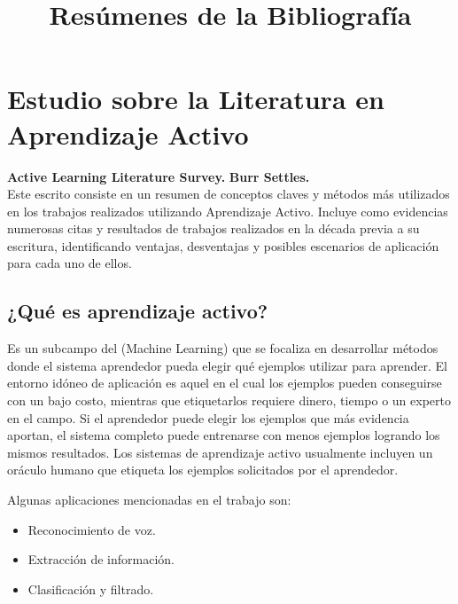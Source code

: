 \documentclass[11pt,spanish]{article}
\title{Resúmenes de la Bibliografía}
\begin{document}
\maketitle

\section{Estudio sobre la Literatura en Aprendizaje Activo}

\textbf{Active Learning Literature Survey.}
\textbf{Burr Settles.}
\\
Este escrito consiste en un resumen de conceptos claves y métodos más utilizados
en los trabajos realizados utilizando Aprendizaje Activo. Incluye como evidencias
numerosas citas y resultados de trabajos realizados en la década previa a su
escritura, identificando ventajas, desventajas y posibles escenarios de aplicación 
para cada uno de ellos.

\subsection{¿Qué es aprendizaje activo?}
Es un subcampo del (Machine Learning) que se focaliza en desarrollar métodos
donde el sistema aprendedor pueda elegir qué ejemplos utilizar para aprender.
El entorno idóneo de aplicación es aquel en el cual los ejemplos pueden
conseguirse con un bajo costo, mientras que etiquetarlos requiere dinero, tiempo
o un experto en el campo. Si el aprendedor puede elegir los ejemplos que más
evidencia aportan, el sistema completo puede entrenarse con menos ejemplos
logrando los mismos resultados.
Los sistemas de aprendizaje activo usualmente incluyen un oráculo humano que
etiqueta los ejemplos solicitados por el aprendedor.

Algunas aplicaciones mencionadas en el trabajo son:
\begin{itemize}
    \item Reconocimiento de voz.
    \item Extracción de información.
    \item Clasificación y filtrado.
\end{itemize}
\end{document}

